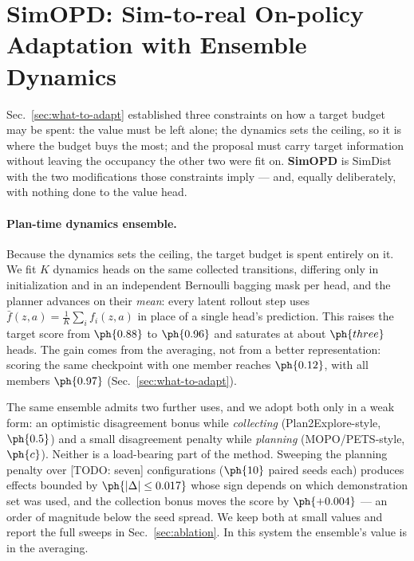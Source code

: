 
\section{SimOPD: Sim-to-real On-policy Adaptation with Ensemble Dynamics}
\label{simopd}

Sec.~\ref{sec:what-to-adapt} established three constraints on how a target
budget may be spent: the value must be left alone; the dynamics sets the
ceiling, so it is where the budget buys the most; and the proposal must carry
target information without leaving the occupancy the other two were fit on.
\textbf{SimOPD} is SimDist with the two modifications those constraints imply
--- and, equally deliberately, with nothing done to the value head.

\paragraph{Plan-time dynamics ensemble.}
Because the dynamics sets the ceiling, the target budget is spent entirely on
it. We fit $K$ dynamics heads
on the same collected transitions, differing only in initialization and in an
independent Bernoulli bagging mask per head, and the planner advances on their
\emph{mean}: every latent rollout step uses
$\bar{f}(z,a)=\frac{1}{K}\sum_i f_i(z,a)$ in place of a single head's
prediction. This raises the target score from $\ph{0.88}$ to $\ph{0.96}$ and
saturates at about $\ph{three}$ heads. The gain comes from the averaging, not
from a better representation: scoring the same checkpoint with one member
reaches $\ph{0.12}$, with all members $\ph{0.97}$
(Sec.~\ref{sec:what-to-adapt}).

The same ensemble admits two further uses, and we adopt both only in a weak
form: an optimistic disagreement bonus while \emph{collecting}
(Plan2Explore-style, $\ph{0.5}$) and a small disagreement penalty while
\emph{planning} (MOPO/PETS-style, $\ph{c}$). Neither is a load-bearing part of
the method. Sweeping the planning penalty over [TODO: seven] configurations
($\ph{10}$ paired seeds each) produces effects bounded by $\ph{|\Delta|\le
0.017}$ whose sign depends on which demonstration set was used, and the
collection bonus moves the score by $\ph{+0.004}$ --- an order of magnitude
below the seed spread. We keep both at small values and report the full sweeps
in Sec.~\ref{sec:ablation}. In this system the ensemble's value is in the
averaging.

